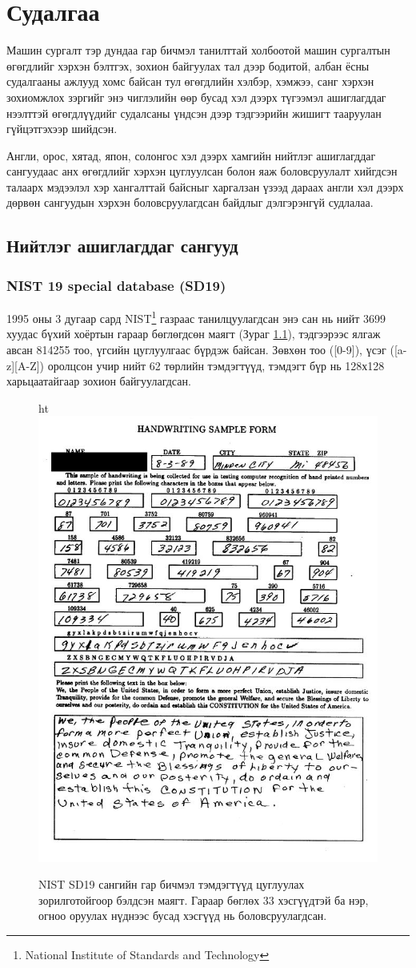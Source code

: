 \chapter{Судалгаа}

Машин сургалт тэр дундаа гар бичмэл танилттай холбоотой машин сургалтын өгөгдлийг хэрхэн бэлтгэх, зохион байгуулах тал дээр бодитой, албан ёсны судалгааны ажлууд хомс байсан тул өгөгдлийн хэлбэр, хэмжээ, санг хэрхэн зохиомжлох зэргийг энэ чиглэлийн өөр бусад хэл дээрх түгээмэл ашиглагддаг нээлттэй өгөгдлүүдийг судалсаны үндсэн дээр тэдгээрийн жишигт тааруулан гүйцэтгэхээр шийдсэн.

Англи, орос, хятад, япон, солонгос хэл дээрх хамгийн нийтлэг ашиглагддаг сангуудаас анх өгөгдлийг хэрхэн цуглуулсан болон яаж боловсруулалт хийгдсэн талаарх мэдээлэл хэр хангалттай байсныг харгалзан үзээд дараах англи хэл дээрх дөрвөн сангуудын хэрхэн боловсруулагдсан байдлыг дэлгэрэнгүй судлалаа.

\section{Нийтлэг ашиглагддаг сангууд}

\subsection{NIST 19 special database (SD19)}

1995 оны 3 дугаар сард NIST\footnote{National Institute of Standards and Technology} газраас танилцуулагдсан энэ сан нь нийт 3699 хуудас бүхий хоёртын гараар бөглөгдсөн маягт (Зураг \ref{fig:sd19}), тэдгээрээс ялгаж авсан 814255 тоо, үгсийн цуглуулгаас бүрдэж байсан. Зөвхөн тоо ([0-9]), үсэг ([a-z][A-Z]) оролцсон учир нийт 62 төрлийн тэмдэгтүүд, тэмдэгт бүр нь 128х128 харьцаатайгаар зохион байгуулагдсан. \cite{nist19}

\begin{figure}{ht}
	\centering
	\includegraphics[width=0.6\linewidth]{images/sd19}
	\caption{NIST SD19 сангийн гар бичмэл тэмдэгтүүд цуглуулах зорилготойгоор бэлдсэн маягт. Гараар бөглөх 33 хэсгүүдтэй ба нэр, огноо оруулах нүднээс бусад хэсгүүд нь боловсруулагдсан.}
	\label{fig:sd19}
\end{figure}

